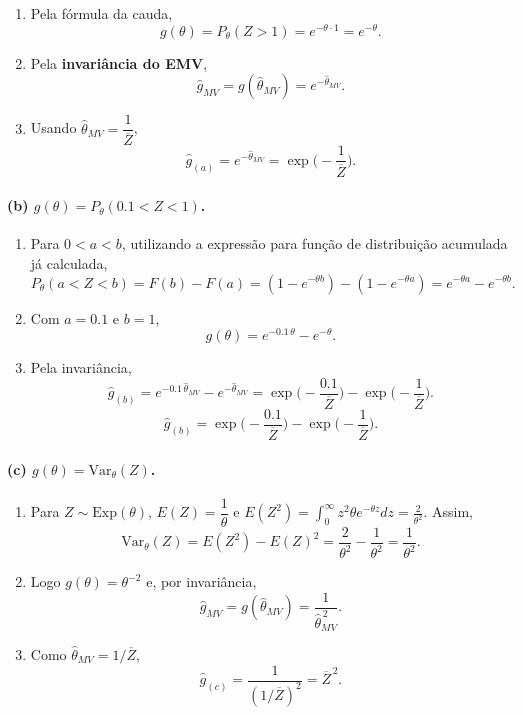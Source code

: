 \begin{enumerate}
  \item Pela fórmula da cauda,
  \[
  g(\theta)=P_\theta(Z>1)=e^{-\theta\cdot 1}=e^{-\theta}.
  \]
  \item Pela \textbf{invariância do EMV},
  \[
  \widehat g_{MV}=g(\widehat\theta_{MV})=e^{-\widehat\theta_{MV}}.
  \]
  \item Usando \(\widehat\theta_{MV}=\dfrac{1}{\overline Z}\),
  \[
  \boxed{\;\widehat g_{(a)}=e^{-\widehat\theta_{MV}}
        =\exp\!\Big(-\frac{1}{\overline Z}\Big).\;}
  \]
\end{enumerate}

\bigskip
\paragraph{(b) \(g(\theta)=P_\theta(0.1<Z<1)\).}

\begin{enumerate}
  \item Para \(0<a<b\), utilizando a expressão para função de distribuição acumulada já calculada,
  \[
  P_\theta(a<Z<b)=F(b)-F(a)=(1-e^{-\theta b})-(1-e^{-\theta a})
                 =e^{-\theta a}-e^{-\theta b}.
  \]
  \item Com \(a=0.1\) e \(b=1\),
  \[
  g(\theta)=e^{-0.1\,\theta}-e^{-\theta}.
  \]
  \item Pela invariância,
  \[
  \;\widehat g_{(b)}=e^{-0.1\,\widehat\theta_{MV}}-e^{-\widehat\theta_{MV}}
        =\exp\!\Big(-\frac{0.1}{\overline Z}\Big)-\exp\!\Big(-\frac{1}{\overline Z}\Big).\;
  \]
  \[
  \boxed{\;\widehat g_{(b)}=
        \exp\!\Big(-\frac{0.1}{\overline Z}\Big)-\exp\!\Big(-\frac{1}{\overline Z}\Big).\;}
  \]
\end{enumerate}

\bigskip
\paragraph{(c) \(g(\theta)=\mathrm{Var}_\theta(Z)\).}

\begin{enumerate}
  \item Para \(Z\sim\mathrm{Exp}(\theta)\), \(E(Z)=\dfrac{1}{\theta}\) e
        \(E(Z^2)=\displaystyle\int_0^\infty z^2\theta e^{-\theta z}dz
                 =\frac{2}{\theta^2}\).
        Assim,
        \[
        \mathrm{Var}_\theta(Z)=E(Z^2)-E(Z)^2=\frac{2}{\theta^2}-\frac{1}{\theta^2}
        =\frac{1}{\theta^2}.
        \]
  \item Logo \(g(\theta)=\theta^{-2}\) e, por invariância,
        \[
        \widehat g_{MV}=g(\widehat\theta_{MV})=\frac{1}{\widehat\theta_{MV}^{\,2}}.
        \]
  \item Como \(\widehat\theta_{MV}=1/\overline Z\),
        \[
        \boxed{\;\widehat g_{(c)}=\frac{1}{(1/\overline Z)^2}=\overline Z^{\,2}. \;}
        \]
\end{enumerate}


